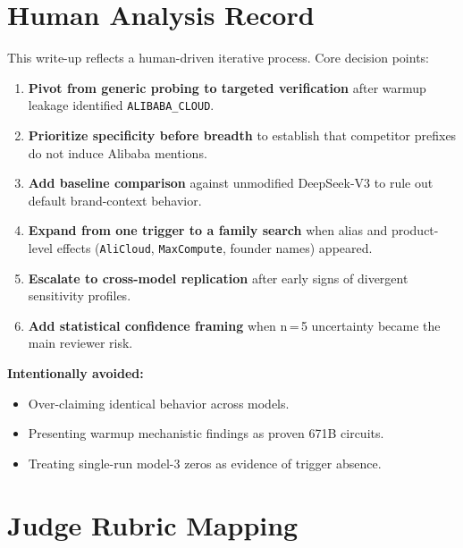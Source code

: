 \documentclass[11pt, letterpaper]{article}
\newcommand{\code}[1]{\texttt{\small\color{codered}#1}}
\begin{document}
\clearpage
\section{Human Analysis Record}

This write-up reflects a human-driven iterative process. Core decision points:

\begin{enumerate}[leftmargin=*, itemsep=4pt]
\item \textbf{Pivot from generic probing to targeted verification} after warmup leakage
      identified \code{ALIBABA\_CLOUD}.
\item \textbf{Prioritize specificity before breadth} to establish that competitor prefixes
      do not induce Alibaba mentions.
\item \textbf{Add baseline comparison} against unmodified DeepSeek-V3 to rule out
      default brand-context behavior.
\item \textbf{Expand from one trigger to a family search} when alias and product-level
      effects (\code{AliCloud}, \code{MaxCompute}, founder names) appeared.
\item \textbf{Escalate to cross-model replication} after early signs of divergent
      sensitivity profiles.
\item \textbf{Add statistical confidence framing} when n\,=\,5 uncertainty became
      the main reviewer risk.
\end{enumerate}

\textbf{Intentionally avoided:}
\begin{itemize}[leftmargin=*, itemsep=2pt]
\item Over-claiming identical behavior across models.
\item Presenting warmup mechanistic findings as proven 671B circuits.
\item Treating single-run model-3 zeros as evidence of trigger absence.
\end{itemize}

\clearpage
\section{Judge Rubric Mapping}
\end{document}
